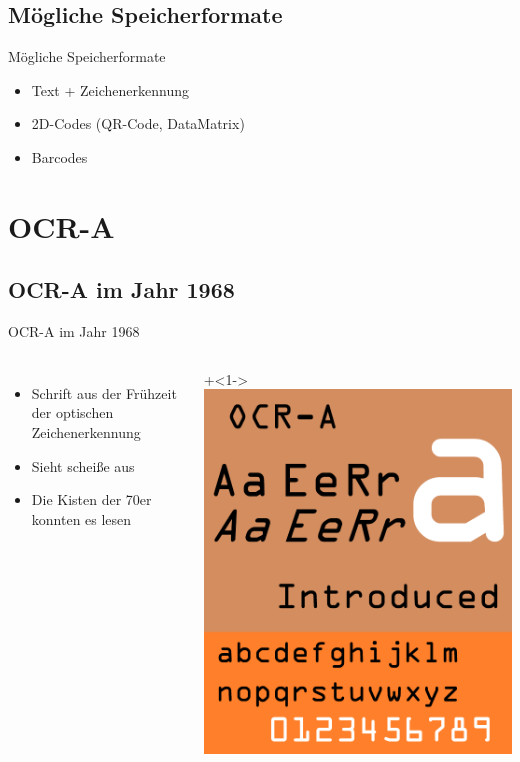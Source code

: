 \subsection{Mögliche Speicherformate}
\begin{frame}{Mögliche Speicherformate}
	\begin{itemize}
	\item Text + Zeichenerkennung
	\item 2D-Codes (QR-Code, DataMatrix)
	\item Barcodes
	\end{itemize}
\end{frame}

\section{OCR-A}

\subsection{OCR-A im Jahr 1968}
\begin{frame}{OCR-A im Jahr 1968}
	\begin{columns}
		\begin{itemize}
		\item<2-> Schrift aus der Frühzeit der optischen Zeichenerkennung
		\item<3-> Sieht scheiße aus
		\item<4-> Die Kisten der 70er konnten es lesen
		\end{itemize}
		\onslide+<1->\includegraphics[width=\textwidth]{penma/others/ocr-a.pdf}
	\end{columns}
\end{frame}

